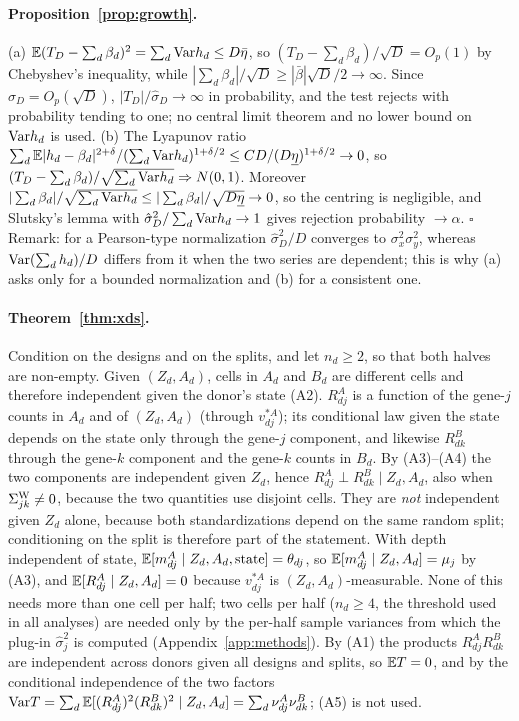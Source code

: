 \paragraph{Proposition~\ref{prop:growth}.} (a) $\mathbb{E}(T_D-\sum_d\beta_d)^2=\sum_d\mathrm{Var} h_d\le D\bar\eta$, so $(T_D-\sum_d\beta_d)/\sqrt D=O_p(1)$ by Chebyshev's inequality, while $|\sum_d\beta_d|/\sqrt D\ge|\bar\beta|\sqrt D/2\to\infty$. Since $\hat\sigma_D=O_p(\sqrt D)$, $|T_D|/\hat\sigma_D\to\infty$ in probability, and the test rejects with probability tending to one; no central limit theorem and no lower bound on $\mathrm{Var} h_d$ is used. (b) The Lyapunov ratio $\sum_d\mathbb{E}|h_d-\beta_d|^{2+\delta}/(\sum_d\mathrm{Var} h_d)^{1+\delta/2}\le CD/(D\underline\eta)^{1+\delta/2}\to0$, so $(T_D-\sum_d\beta_d)/\sqrt{\sum_d\mathrm{Var} h_d}\Rightarrow N(0,1)$. Moreover $|\sum_d\beta_d|/\sqrt{\sum_d\mathrm{Var} h_d}\le|\sum_d\beta_d|/\sqrt{D\underline\eta}\to0$, so the centring is negligible, and Slutsky's lemma with $\hat\sigma_D^2/\sum_d\mathrm{Var} h_d\to1$ gives rejection probability $\to\alpha$. $\square$ Remark: for a Pearson-type normalization $\hat\sigma_D^2/D$ converges to $\sigma_x^2\sigma_y^2$, whereas $\mathrm{Var}(\sum_dh_d)/D$ differs from it when the two series are dependent; this is why (a) asks only for a bounded normalization and (b) for a consistent one.

\paragraph{Theorem~\ref{thm:xds}.} Condition on the designs and on the splits, and let $n_d\ge2$, so that both halves are non-empty. Given $(Z_d,A_d)$, cells in $A_d$ and $B_d$ are different cells and therefore independent given the donor's state (A2). $R^A_{dj}$ is a function of the gene-$j$ counts in $A_d$ and of $(Z_d,A_d)$ (through $v^{*A}_{dj}$); its conditional law given the state depends on the state only through the gene-$j$ component, and likewise $R^B_{dk}$ through the gene-$k$ component and the gene-$k$ counts in $B_d$. By (A3)--(A4) the two components are independent given $Z_d$, hence $R^A_{dj}\perp R^B_{dk}\mid Z_d,A_d$, also when $\Sigma^{\mathrm{W}}_{jk}\neq0$, because the two quantities use disjoint cells. They are \emph{not} independent given $Z_d$ alone, because both standardizations depend on the same random split; conditioning on the split is therefore part of the statement. With depth independent of state, $\mathbb{E}[m^A_{dj}\mid Z_d,A_d,\text{state}]=\theta_{dj}$, so $\mathbb{E}[m^A_{dj}\mid Z_d,A_d]=\mu_j$ by (A3), and $\mathbb{E}[R^A_{dj}\mid Z_d,A_d]=0$ because $v^{*A}_{dj}$ is $(Z_d,A_d)$-measurable. None of this needs more than one cell per half; two cells per half ($n_d\ge4$, the threshold used in all analyses) are needed only by the per-half sample variances from which the plug-in $\hat\sigma^2_j$ is computed (Appendix~\ref{app:methods}). By (A1) the products $R^A_{dj}R^B_{dk}$ are independent across donors given all designs and splits, so $\mathbb{E} T=0$, and by the conditional independence of the two factors $\mathrm{Var} T=\sum_d\mathbb{E}[(R^A_{dj})^2(R^B_{dk})^2\mid Z_d,A_d]=\sum_d\nu^A_{dj}\nu^B_{dk}$; (A5) is not used.


